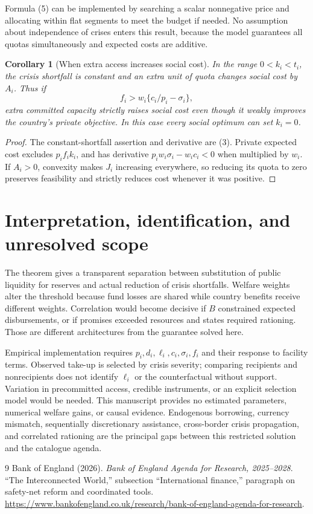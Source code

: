\documentclass[11pt,a4paper]{article}
\newtheorem{corollary}[theorem]{Corollary}
\theoremstyle{definition}
\theoremstyle{remark}
\begin{document}
Formula (5) can be implemented by searching a scalar nonnegative price and allocating within flat segments to meet the budget if needed. No assumption about independence of crises enters this result, because the model guarantees all quotas simultaneously and expected costs are additive.

\begin{corollary}[When extra access increases social cost]
In the range $0<k_i<t_i$, the crisis shortfall is constant and an extra unit of quota changes social cost by $A_i$. Thus if
\[
 f_i>w_i\{c_i/p_i-\sigma_i\},
\]
extra committed capacity strictly raises social cost even though it weakly improves the country's private objective. In this case every social optimum can set $k_i=0$.
\end{corollary}
\begin{proof}
The constant-shortfall assertion and derivative are (3). Private expected cost excludes $p_if_ik_i$, and has derivative $p_iw_i\sigma_i-w_ic_i<0$ when multiplied by $w_i$. If $A_i>0$, convexity makes $J_i$ increasing everywhere, so reducing its quota to zero preserves feasibility and strictly reduces cost whenever it was positive.
\end{proof}

\section{Interpretation, identification, and unresolved scope}
The theorem gives a transparent separation between substitution of public liquidity for reserves and actual reduction of crisis shortfalls. Welfare weights alter the threshold because fund losses are shared while country benefits receive different weights. Correlation would become decisive if $B$ constrained expected disbursements, or if promises exceeded resources and states required rationing. Those are different architectures from the guarantee solved here.

Empirical implementation requires $p_i,d_i,\ell_i,c_i,\sigma_i,f_i$ and their response to facility terms. Observed take-up is selected by crisis severity; comparing recipients and nonrecipients does not identify $\ell_i$ or the counterfactual without support. Variation in precommitted access, credible instruments, or an explicit selection model would be needed. This manuscript provides no estimated parameters, numerical welfare gains, or causal evidence. Endogenous borrowing, currency mismatch, sequentially discretionary assistance, cross-border crisis propagation, and correlated rationing are the principal gaps between this restricted solution and the catalogue agenda.
\begin{thebibliography}{9}
 Bank of England (2026).
\emph{Bank of England Agenda for Research, 2025--2028}.
``The Interconnected World,'' subsection ``International finance,'' paragraph on safety-net reform and coordinated tools.
\url{https://www.bankofengland.co.uk/research/bank-of-england-agenda-for-research}.
\end{thebibliography}
\end{document}
